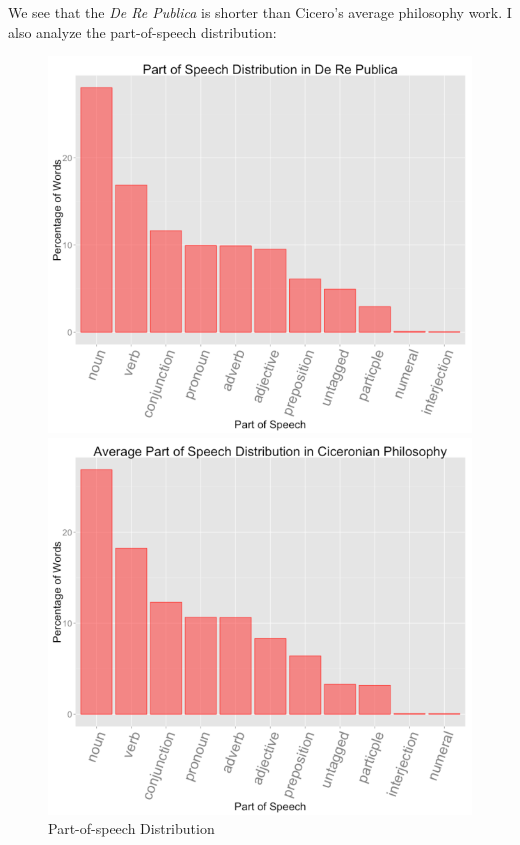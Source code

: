 \documentclass[a4paper, 12pt,notitlepage]{article} %
\newenvironment{figurecenter}{%
	\setlength\topsep{-7pt}
	\setlength\parskip{-7pt}
	\singlespacing %
	\begin{center}
	}{%
	\end{center}
\vspace{-5pt}
}
\numberwithin{dummy}{subsection}
\numberwithin{dummy}{section}
\theoremstyle{named}
\theoremstyle{definition}
\theoremstyle{definition}
\begin{document}
\noindent We see that the \textit{De Re Publica} is shorter than Cicero's average philosophy work. I also analyze the part-of-speech distribution:

\begin{figure}[H]
	\begin{figurecenter}
	\begin{minipage}{.5\textwidth}
		\centering
		\includegraphics[scale=0.75]{image1.png}
	\end{minipage}%
	\begin{minipage}{.5\textwidth}
		\centering
		\includegraphics[scale=0.75]{image2.png}
	\end{minipage}
	\caption{Part-of-speech Distribution}
	\end{figurecenter}
\end{figure}
\end{document}
